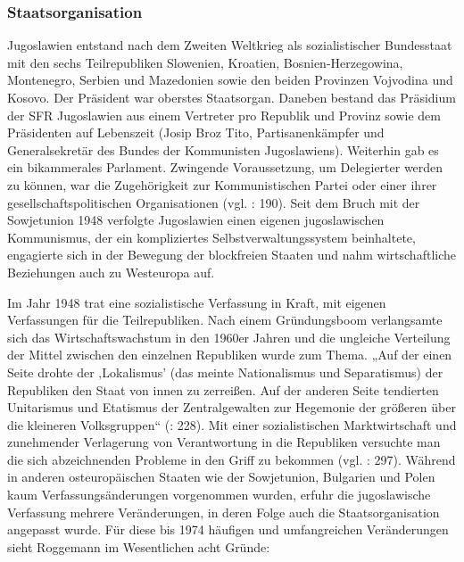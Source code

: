 \subsubsection{Staatsorganisation }

Jugoslawien entstand nach dem Zweiten Weltkrieg als sozialistischer Bundesstaat mit den sechs Teilrepubliken Slowenien, Kroatien, Bosnien-Herzegowina, Montenegro, Serbien und Mazedonien sowie den beiden Provinzen Vojvodina und Kosovo. Der Präsident war oberstes Staatsorgan. Daneben bestand das Präsidium der SFR Jugoslawien aus einem Vertreter pro Republik und Provinz sowie dem Präsidenten auf Lebenszeit (Josip Broz Tito, Partisanenkämpfer und Generalsekretär des Bundes der Kommunisten Jugoslawiens). Weiterhin gab es ein bikammerales Parlament. Zwingende Voraussetzung, um Delegierter werden zu können, war die Zugehörigkeit zur Kommunistischen Partei oder einer ihrer gesellschaftspolitischen Organisationen (vgl. \cite{toepfer}: 190). Seit dem Bruch mit der Sowjetunion 1948 verfolgte Jugoslawien einen eigenen jugoslawischen Kommunismus, der ein kompliziertes Selbstverwaltungssystem beinhaltete, engagierte sich in der Bewegung der blockfreien Staaten und nahm wirtschaftliche Beziehungen auch zu Westeuropa auf.\par
Im Jahr 1948 trat eine sozialistische Verfassung in Kraft, mit eigenen Verfassungen für die Teilrepubliken. Nach einem Gründungsboom verlangsamte sich das Wirtschaftswachstum in den 1960er Jahren und die ungleiche Verteilung der Mittel zwischen den einzelnen Republiken wurde zum Thema. „Auf der einen Seite drohte der ‚Lokalismus’ (das meinte Nationalismus und Separatismus) der Republiken den Staat von innen zu zerreißen. Auf der anderen Seite tendierten Unitarismus und Etatismus der Zentralgewalten zur Hegemonie der größeren über die kleineren Volksgruppen“ (\cite{calic10}: 228). Mit einer sozialistischen Marktwirtschaft und zunehmender Verlagerung von Verantwortung in die Republiken versuchte man die sich abzeichnenden Probleme in den Griff zu bekommen (vgl. \cite{ramet}: 297). Während in anderen osteuropäischen Staaten wie der Sowjetunion, Bulgarien und Polen kaum Verfassungsänderungen vorgenommen wurden, erfuhr die jugoslawische Verfassung mehrere Veränderungen, in deren Folge auch die Staatsorganisation angepasst wurde. Für diese bis 1974 häufigen und umfangreichen Veränderungen sieht Roggemann im Wesentlichen acht Gründe:
